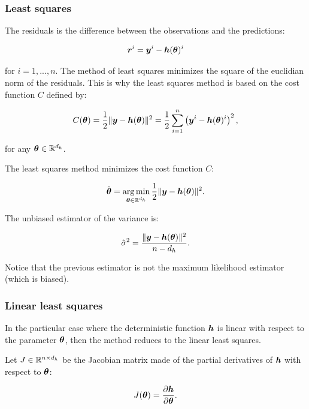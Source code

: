 \documentclass{beamer}
\begin{document}

\begin{frame}
\frametitle{Least squares}

The residuals is the difference between the observations and the
predictions:

$$
       \boldsymbol{r}^i = \boldsymbol{y}^i - \boldsymbol{h}(\boldsymbol{\theta})^i
$$

for $i=1,...,n$. The method of least squares minimizes the square
of the euclidian norm of the residuals. This is why the least squares
method is based on the cost function $C$ defined by:

$$
       C(\boldsymbol{\theta}) = \frac{1}{2} \|\boldsymbol{y} - \boldsymbol{h}(\boldsymbol{\theta})\|^2 = \frac{1}{2} \sum_{i=1}^n \left( \boldsymbol{y}^i - \boldsymbol{h}(\boldsymbol{\theta})^i \right)^2,
$$

for any $\boldsymbol{\theta} \in \mathbb{R}^{d_h}$.


\end{frame}


\begin{frame}
The least squares method minimizes the cost function $C$:

$$
\hat{\boldsymbol{\theta}} 
= \operatorname*{arg\,min}_{\boldsymbol{\theta} \in \mathbb{R}^{d_h}} \frac{1}{2} \|\boldsymbol{y} - \boldsymbol{h}(\boldsymbol{\theta})\|^2.
$$

The unbiased estimator of the variance is:

$$
       \hat{\sigma}^2 = \frac{\|\boldsymbol{y} - \boldsymbol{h}(\boldsymbol{\theta})\|^2}{n - d_h}.
$$

Notice that the previous estimator is not the maximum likelihood
estimator (which is biased).
\end{frame}


\begin{frame}
\frametitle{Linear least squares}

In the particular case where the deterministic function $\boldsymbol{h}$
is linear with respect to the parameter $\boldsymbol{\theta}$, then the
method reduces to the linear least squares. 

Let $J \in \mathbb{R}^{n \times d_h}$ be the Jacobian matrix made of the
partial derivatives of $\boldsymbol{h}$ with respect to
$\boldsymbol{\theta}$:

$$
       J(\boldsymbol{\theta}) = \frac{\partial \boldsymbol{h}}{\partial \boldsymbol{\theta}}.
$$

\end{frame}
\end{document}
